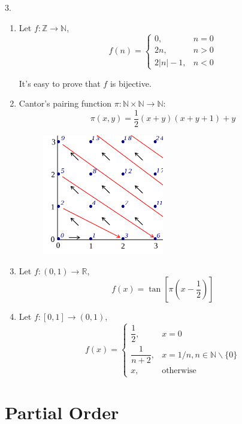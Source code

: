 \documentclass[12pt]{article}
\begin{document}
	3. \begin{enumerate}
		\item Let $f: \mathbb{Z} \rightarrow \mathbb{N}$,
		$$
		f(n)= \begin{cases}0, & n=0 \\ 2 n, & n>0 \\ 2|n|-1, & n<0\end{cases}
		$$
		\par It's easy to prove that $f$ is bijective.
		\item Cantor's pairing function $\pi: \mathbb{N} \times \mathbb{N} \rightarrow \mathbb{N}$:
		$$\pi(x,y) = \frac{1}{2}\left(x+y\right)\left(x+y+1\right)+y$$
		\begin{figure}[h!]
			\centering
			\includegraphics[width=0.5\textwidth]{Cantor.png}
			\label{fig:cantor}
		\end{figure}
		\item Let $f: (0,1) \rightarrow \mathbb{R}$,
		$$
		f(x)= \tan \left[ \pi \left( x-\dfrac{1}{2} \right) \right] 
		$$
		\item Let $f: [0,1] \rightarrow (0,1)$,
		$$
		f(x)= \begin{cases}\dfrac{1}{2}, & x=0 \\\dfrac{1}{n+2}, & x=1 / n, n \in \mathbb{N}\backslash \! \{0\} \\ x, & \text {otherwise}\end{cases}
		$$
	\end{enumerate}
\section{Partial Order}
\end{document}
